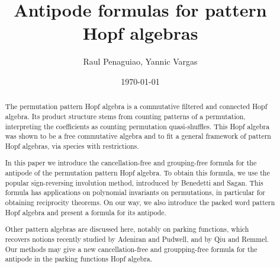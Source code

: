 \documentclass[12pt, reqno]{amsart}
\theoremstyle{definition}
\begin{document}
\title{Antipode formulas for pattern Hopf algebras} %



\author{Raul Penaguiao, Yannic Vargas}
\address{HAEUSLER AG, Basel}
\address{Technische Universit\"at Graz}
\date{\today} %

\begin{abstract}
The permutation pattern Hopf algebra is a commutative filtered and connected Hopf algebra.
Its product structure stems from counting patterns of a permutation, interpreting the coefficients as counting permutation quasi-shuffles.
This Hopf algebra was shown to be a free commutative algebra and to fit a general framework of pattern Hopf algebras, via species with restrictions.

In this paper we introduce the cancellation-free and grouping-free formula for the antipode of the permutation pattern Hopf algebra.
To obtain this formula, we use the popular sign-reversing involution method, introduced by Benedetti and Sagan.
This formula has applications on polynomial invariants on permutations, in particular for obtaining reciprocity theorems.
On our way, we also introduce the packed word pattern Hopf algebra and present a formula for its antipode.

Other pattern algebras are discussed here, notably on parking functions, which recovers notions recently studied by Adeniran and Pudwell, and by Qiu and Remmel.
Our methods may give a new cancellation-free and groupping-free formula for the antipode in the parking functions Hopf algebra.
\end{abstract}


\maketitle

\tableofcontents
\end{document}

